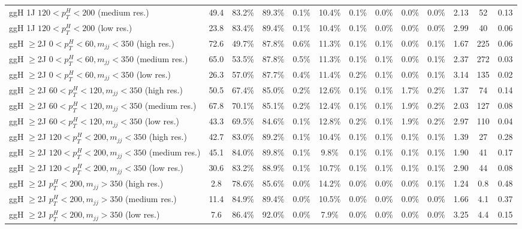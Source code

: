 \begin{table}
\begin{tabular}{lcccccccccccc}
ggH 1J $120 < p_{T}^{H} < 200$ (medium res.) & 49.4 & 83.2\% & 89.3\% & 0.1\% & 10.4\% & 0.1\% & 0.0\% & 0.0\% & 0.0\% & 2.13 & 52 & 0.13 \\
ggH 1J $120 < p_{T}^{H} < 200$ (low res.) & 23.8 & 83.4\% & 89.4\% & 0.1\% & 10.4\% & 0.1\% & 0.0\% & 0.0\% & 0.0\% & 2.99 & 40 & 0.06 \\
ggH $\geq$2J $0 < p_{T}^{H} < 60, m_{jj} < 350$ (high res.) & 72.6 & 49.7\% & 87.8\% & 0.6\% & 11.3\% & 0.1\% & 0.1\% & 0.0\% & 0.1\% & 1.67 & 225 & 0.06 \\
ggH $\geq$2J $0 < p_{T}^{H} < 60, m_{jj} < 350$ (medium res.) & 65.0 & 53.5\% & 87.8\% & 0.5\% & 11.3\% & 0.1\% & 0.1\% & 0.0\% & 0.1\% & 2.37 & 272 & 0.03 \\
ggH $\geq$2J $0 < p_{T}^{H} < 60, m_{jj} < 350$ (low res.) & 26.3 & 57.0\% & 87.7\% & 0.4\% & 11.4\% & 0.2\% & 0.1\% & 0.0\% & 0.1\% & 3.14 & 135 & 0.02 \\
ggH $\geq$2J $60 < p_{T}^{H} < 120, m_{jj} < 350$ (high res.) & 50.5 & 67.4\% & 85.0\% & 0.2\% & 12.6\% & 0.1\% & 0.1\% & 1.7\% & 0.2\% & 1.37 & 74 & 0.14 \\
ggH $\geq$2J $60 < p_{T}^{H} < 120, m_{jj} < 350$ (medium res.) & 67.8 & 70.1\% & 85.1\% & 0.2\% & 12.4\% & 0.1\% & 0.1\% & 1.9\% & 0.2\% & 2.03 & 127 & 0.08 \\
ggH $\geq$2J $60 < p_{T}^{H} < 120, m_{jj} < 350$ (low res.) & 43.3 & 69.5\% & 84.6\% & 0.1\% & 12.8\% & 0.2\% & 0.1\% & 1.9\% & 0.2\% & 2.97 & 110 & 0.04 \\
ggH $\geq$2J $120 < p_{T}^{H} < 200, m_{jj} < 350$ (high res.) & 42.7 & 83.0\% & 89.2\% & 0.1\% & 10.4\% & 0.1\% & 0.1\% & 0.1\% & 0.1\% & 1.39 & 27 & 0.28 \\
ggH $\geq$2J $120 < p_{T}^{H} < 200, m_{jj} < 350$ (medium res.) & 45.1 & 84.0\% & 89.8\% & 0.1\% & 9.8\% & 0.1\% & 0.1\% & 0.1\% & 0.1\% & 1.90 & 41 & 0.17 \\
ggH $\geq$2J $120 < p_{T}^{H} < 200, m_{jj} < 350$ (low res.) & 30.6 & 83.2\% & 88.9\% & 0.1\% & 10.7\% & 0.1\% & 0.1\% & 0.1\% & 0.1\% & 2.90 & 44 & 0.08 \\
ggH $\geq$2J $p_{T}^{H} < 200, m_{jj} > 350$ (high res.) & 2.8 & 78.6\% & 85.6\% & 0.0\% & 14.2\% & 0.0\% & 0.0\% & 0.0\% & 0.1\% & 1.24 & 0.8 & 0.48 \\
ggH $\geq$2J $p_{T}^{H} < 200, m_{jj} > 350$ (medium res.) & 11.4 & 84.9\% & 89.4\% & 0.0\% & 10.5\% & 0.0\% & 0.0\% & 0.0\% & 0.0\% & 1.66 & 4.1 & 0.37 \\
ggH $\geq$2J $p_{T}^{H} < 200, m_{jj} > 350$ (low res.) & 7.6 & 86.4\% & 92.0\% & 0.0\% & 7.9\% & 0.0\% & 0.0\% & 0.0\% & 0.0\% & 3.25 & 4.4 & 0.15 \\

\end{tabular}
\end{table}
